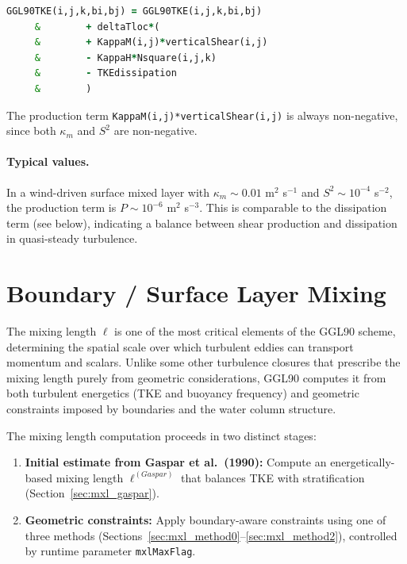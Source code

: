 \documentclass[12pt,letterpaper]{article}
\begin{document}
\begin{lstlisting}[language=Fortran,caption={(ggl90\_calc.F:L605--610) Explicit TKE budget update: production term}]
         GGL90TKE(i,j,k,bi,bj) = GGL90TKE(i,j,k,bi,bj)
     &        + deltaTloc*(
     &        + KappaM(i,j)*verticalShear(i,j)
     &        - KappaH*Nsquare(i,j,k)
     &        - TKEdissipation
     &        )
\end{lstlisting}

The production term \verb|KappaM(i,j)*verticalShear(i,j)| is always non-negative, since both $\kappa_m$ and $S^2$ are non-negative.

\paragraph{Typical values.} In a wind-driven surface mixed layer with $\kappa_m \sim 0.01$ m$^2$ s$^{-1}$ and $S^2 \sim 10^{-4}$ s$^{-2}$, the production term is $P \sim 10^{-6}$ m$^2$ s$^{-3}$. This is comparable to the dissipation term (see below), indicating a balance between shear production and dissipation in quasi-steady turbulence.

\section{Boundary / Surface Layer Mixing}
\label{sec:boundary_mixing}

The mixing length $\ell$ is one of the most critical elements of the GGL90 scheme, determining the spatial scale over which turbulent eddies can transport momentum and scalars. Unlike some other turbulence closures that prescribe the mixing length purely from geometric considerations, GGL90 computes it from both turbulent energetics (TKE and buoyancy frequency) and geometric constraints imposed by boundaries and the water column structure.

The mixing length computation proceeds in two distinct stages:

\begin{enumerate}
\item \textbf{Initial estimate from Gaspar et al.\ (1990):} Compute an energetically-based mixing length $\ell^{(Gaspar)}$ that balances TKE with stratification (Section~\ref{sec:mxl_gaspar}).
\item \textbf{Geometric constraints:} Apply boundary-aware constraints using one of three methods (Sections~\ref{sec:mxl_method0}--\ref{sec:mxl_method2}), controlled by runtime parameter \verb|mxlMaxFlag|.
\end{enumerate}
\end{document}
